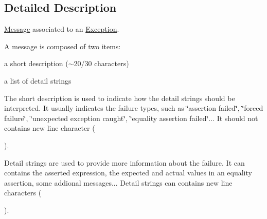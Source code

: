 \subsection{Detailed Description}
\hyperlink{class_message}{Message} associated to an \hyperlink{class_exception}{Exception}.

A message is composed of two items\-: 


\begin{DoxyItemize}
\item a short description ($\sim$20/30 characters)
\item a list of detail strings
\end{DoxyItemize}

The short description is used to indicate how the detail strings should be interpreted. It usually indicates the failure types, such as \char`\"{}assertion failed\char`\"{}, \char`\"{}forced failure\char`\"{}, \char`\"{}unexpected exception caught\char`\"{}, \char`\"{}equality assertion failed\char`\"{}... It should not contains new line character (\par
).

Detail strings are used to provide more information about the failure. It can contains the asserted expression, the expected and actual values in an equality assertion, some addional messages... Detail strings can contains new line characters (\par
). 

